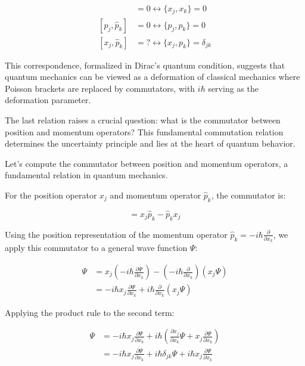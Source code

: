 \documentclass[10pt]{article}
\begin{document}
\begin{align*}
[x_{j}, x_{k}] &= 0 \longleftrightarrow \{x_{j}, x_{k}\} = 0 \\
[\hat{p}_{j}, \hat{p}_{k}] &= 0 \longleftrightarrow \{p_{j}, p_{k}\} = 0 \tag{1.56} \\
[x_{j}, \hat{p}_{k}] &= ? \longleftrightarrow \{x_{j}, p_{k}\} = \delta_{j k}
\end{align*}

This correspondence, formalized in Dirac's quantum condition, suggests that quantum mechanics can be viewed as a deformation of classical mechanics where Poisson brackets are replaced by commutators, with $i\hbar$ serving as the deformation parameter.

The last relation raises a crucial question: what is the commutator between position and momentum operators? This fundamental commutation relation determines the uncertainty principle and lies at the heart of quantum behavior.


Let's compute the commutator between position and momentum operators, a fundamental relation in quantum mechanics.

For the position operator $x_j$ and momentum operator $\hat{p}_k$, the commutator is:

\begin{equation*}
[x_j, \hat{p}_k] = x_j\hat{p}_k - \hat{p}_k x_j \tag{1.57}
\end{equation*}

Using the position representation of the momentum operator $\hat{p}_k = -i\hbar\frac{\partial}{\partial x_k}$, we apply this commutator to a general wave function $\Psi$:

\begin{align*}
[x_j, \hat{p}_k]\Psi &= x_j\left(-i\hbar\frac{\partial\Psi}{\partial x_k}\right) - \left(-i\hbar\frac{\partial}{\partial x_k}\right)(x_j\Psi) \\
&= -i\hbar x_j\frac{\partial\Psi}{\partial x_k} + i\hbar\frac{\partial}{\partial x_k}(x_j\Psi)
\end{align*}

Applying the product rule to the second term:

\begin{align*}
[x_j, \hat{p}_k]\Psi &= -i\hbar x_j\frac{\partial\Psi}{\partial x_k} + i\hbar\left(\frac{\partial x_j}{\partial x_k}\Psi + x_j\frac{\partial\Psi}{\partial x_k}\right) \tag{1.58} \\
&= -i\hbar x_j\frac{\partial\Psi}{\partial x_k} + i\hbar\delta_{jk}\Psi + i\hbar x_j\frac{\partial\Psi}{\partial x_k}
\end{align*}
\end{document}
